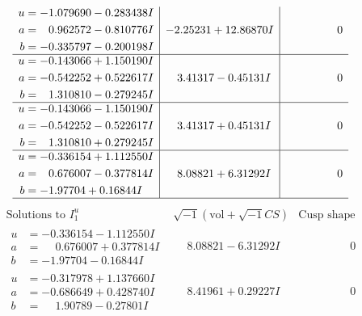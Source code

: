 \documentclass[1p]{elsarticle_modified}
\theoremstyle{definition}
\newcommand{\I}{\sqrt{-1}}
\begin{document}
$$\begin{array}{c|c|c}
\begin{aligned}
u &= -1.079690 - 0.283438 I \\
a &= \phantom{-}0.962572 - 0.810776 I \\
b &= -0.335797 - 0.200198 I\end{aligned}
 & -2.25231 + 12.86870 I & \phantom{-0.000000 } 0 \\ \hline\begin{aligned}
u &= -0.143066 + 1.150190 I \\
a &= -0.542252 + 0.522617 I \\
b &= \phantom{-}1.310810 - 0.279245 I\end{aligned}
 & \phantom{-}3.41317 - 0.45131 I & \phantom{-0.000000 } 0 \\ \hline\begin{aligned}
u &= -0.143066 - 1.150190 I \\
a &= -0.542252 - 0.522617 I \\
b &= \phantom{-}1.310810 + 0.279245 I\end{aligned}
 & \phantom{-}3.41317 + 0.45131 I & \phantom{-0.000000 } 0 \\ \hline\begin{aligned}
u &= -0.336154 + 1.112550 I \\
a &= \phantom{-}0.676007 - 0.377814 I \\
b &= -1.97704 + 0.16844 I\end{aligned}
 & \phantom{-}8.08821 + 6.31292 I & \phantom{-0.000000 } 0\\
 \hline 
 \end{array}$$\newpage$$\begin{array}{c|c|c}  
\text{Solutions to }I^u_{1}& \I (\text{vol} + \sqrt{-1}CS) & \text{Cusp shape}\\
 \hline 
\begin{aligned}
u &= -0.336154 - 1.112550 I \\
a &= \phantom{-}0.676007 + 0.377814 I \\
b &= -1.97704 - 0.16844 I\end{aligned}
 & \phantom{-}8.08821 - 6.31292 I & \phantom{-0.000000 } 0 \\ \hline\begin{aligned}
u &= -0.317978 + 1.137660 I \\
a &= -0.686649 + 0.428740 I \\
b &= \phantom{-}1.90789 - 0.27801 I\end{aligned}
 & \phantom{-}8.41961 + 0.29227 I & \phantom{-0.000000 } 0 \\ \hline\begin{aligned}

\end{aligned}
\end{array}$$
\end{document}
